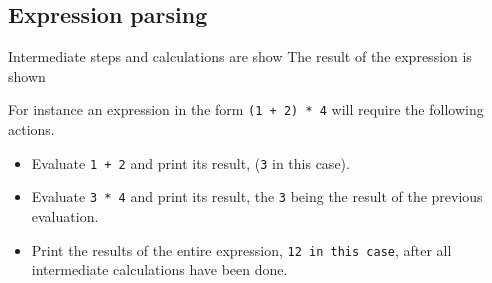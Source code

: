 \documentclass[11pt,a4paper]{article}
\begin{document}
\subsection{Expression parsing}
Intermediate steps and calculations are show
The result of the expression is shown

For instance an expression in the form \texttt{(1 + 2) * 4} will require the following actions.

\begin{itemize}
\item Evaluate \texttt{1 + 2} and print its result, (\texttt{3} in this case).
\item Evaluate \texttt{3 * 4} and print its result, the \texttt{3} being the result of the previous evaluation.
\item Print the results of the entire expression, \texttt{12 in this case}, after all intermediate calculations have been done.
\end{itemize}
\end{document}
